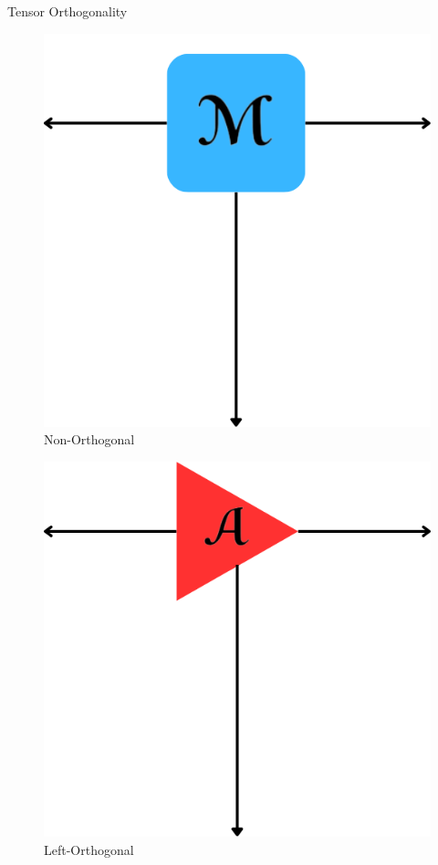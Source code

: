 \documentclass{beamer}
\begin{document}
\begin{frame}{Tensor Orthogonality}
    \scriptsize
    \centering
    \setlength\fboxsep{5pt} %
    \setlength\fboxrule{0.5pt} %

    \begin{minipage}{0.32\textwidth}
        \centering
        \begin{figure}
            \centering
            \includegraphics[height = 0.6\linewidth]{images/General Tensor Diagrams/M_tensor_2.png}
            \caption*{Non-Orthogonal}
            \label{fig:M_tensor}
        \end{figure}
    \end{minipage}
        \hfill
    \begin{minipage}{0.32\textwidth}
        \centering
        \begin{figure}
            \centering
            \includegraphics[height = 0.6\linewidth]{images/General Tensor Diagrams/A_tensor.png}
            \caption*{Left-Orthogonal}
            \label{fig:enter-label}

\end{figure}
\end{minipage}
\end{frame}
\end{document}
